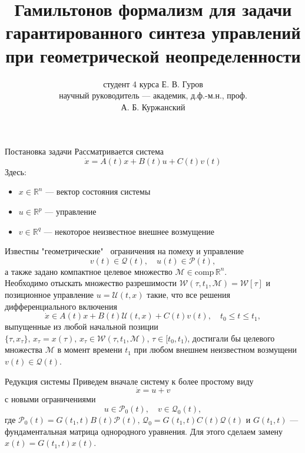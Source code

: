 \documentclass{beamer}
\title[ВКР]
{Гамильтонов формализм для задачи гарантированного синтеза управлений при геометрической неопределенности}
\author[Е. В. Гуров]
{студент 4 курса Е. В. Гуров \\
научный руководитель --- академик, д.ф.-м.н., проф.  \\ А. Б. Куржанский}
\institute[СА]
{ Кафедра системного анализа \\
факультета ВМК МГУ имени М.В. Ломоносова}
\date[31 мая 2022 г.]
\begin{document}
\frame{\titlepage}

\begin{frame}{Постановка задачи}
\footnotesize
Рассматривается система
\begin{equation*}
    \dot{x} = A(t)x + B(t)u + C(t)v(t)
\end{equation*}
Здесь:
\begin{itemize}
    \item \( x \in \mathbb{R}^n \) --- вектор состояния системы
    \item \( u \in \mathbb{R}^p \) --- управление
    \item \( v \in \mathbb{R}^q \) --- некоторое неизвестное внешнее возмущение
\end{itemize}
Известны "геометрические" \ ограничения на помеху и управление
\begin{equation*}
    v(t) \in \mathcal{Q}(t), \quad u(t) \in \mathcal{P}(t),
\end{equation*}
а также задано компактное целевое множество \( \mathcal{M} \in \text{comp} \, \mathbb{R}^n \). \\
Необходимо отыскать множество разрешимости \( \mathcal{W}(\tau, t_1, \mathcal{M}) = \mathcal{W}[\tau] \) и позиционное управление \( u = \mathcal{U}(t,x) \) такие, что все решения дифференциального включения
 \begin{equation*}\label{dif_inclusion}
    \dot{x} \in A(t)x + B(t)\mathcal{U}(t,x) + C(t)v(t), \quad t_0 \le t \le t_1, 
\end{equation*}
выпущенные из любой начальной позиции \( \{\tau, x_{\tau}\}, \, x_{\tau} = x(\tau), \, x_{\tau} \in \mathcal{W}(\tau, t_1, \mathcal{M}) \), \( \tau \in [t_0, t_1) \), достигали бы целевого множества \( \mathcal{M} \) в момент времени \( t_1 \) при любом внешнем неизвестном возмущени \( v(t) \in \mathcal{Q}(t) \).

\end{frame}


\begin{frame}{Редукция системы}
Приведем вначале систему к более простому виду
\begin{equation*}
    \dot{x} = u + v
\end{equation*}
с новыми ограничениями
\begin{equation*}
    u \in \mathcal{P}_0(t), \quad v \in \mathcal{Q}_0(t),
\end{equation*}
где \( \mathcal{P}_0(t) = G(t_1, t) B(t) \mathcal{P}(t), \, \mathcal{Q}_0 = G(t_1,t)C(t)\mathcal{Q}(t) \) и \( G(t_1,t) \) --- фундаментальная матрица однородного уравнения. Для этого сделаем замену \( x(t) = G(t_1, t)x(t) \).
\end{frame}
\end{document}
